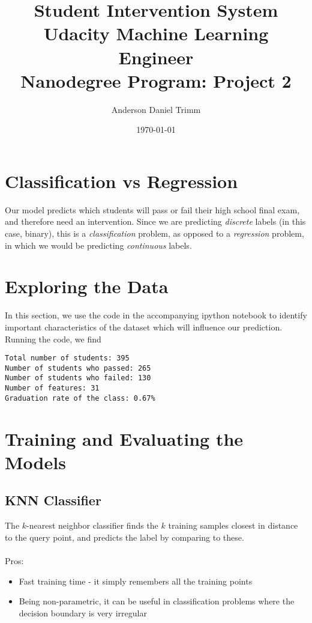 \documentclass[12 pt]{article}
\numberwithin{equation}{section}
\begin{document}
\title{Student Intervention System \\ \footnotesize{Udacity Machine Learning Engineer \\ Nanodegree Program: Project 2}}
\author{Anderson Daniel Trimm}
\date{\today}
\maketitle

\section{Classification vs Regression}
Our model predicts which students will pass or fail their high school final exam, and therefore need an intervention. Since we are predicting \emph{discrete} labels (in this case, binary), this is a \emph{classification} problem, as opposed to a \emph{regression} problem, in which we would be predicting \emph{continuous} labels.
\section{Exploring the Data}
In this section, we use the code in the accompanying ipython notebook to identify important characteristics of the dataset which will influence our prediction. Running the code, we find

\begin{verbatim}	
Total number of students: 395
Number of students who passed: 265
Number of students who failed: 130
Number of features: 31
Graduation rate of the class: 0.67%
\end{verbatim}

\section{Training and Evaluating the Models}
\subsection{KNN Classifier}
The $k$-nearest neighbor classifier finds the $k$ training samples closest in distance to the query point, and predicts the label by comparing to these. \\
\\
Pros:
\begin{itemize}
	\item Fast training time - it simply remembers all the training points
	\item Being non-parametric, it can be useful in classification problems where the decision boundary is very irregular
\end{itemize}
\end{document}
